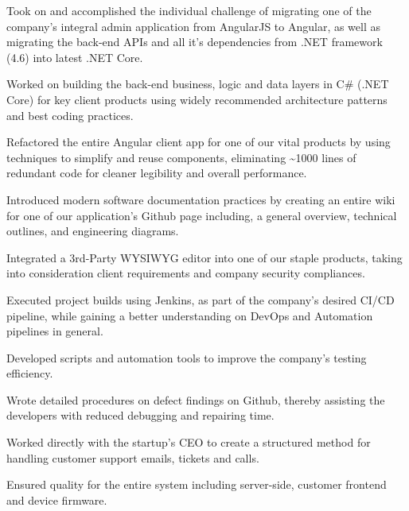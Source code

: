 \documentclass[]{deedy-resume}
\begin{document}
\begin{tightemize}
\item Took on and accomplished the individual challenge of migrating one of the company's integral admin application from AngularJS to Angular, as well as migrating the back-end APIs and all it's dependencies from .NET framework (4.6) into latest .NET Core.
\item Worked on building the back-end business, logic and data layers in C\# (.NET Core) for key client products using widely recommended architecture patterns and best coding practices. 
\item Refactored the entire Angular client app for one of our vital products by using techniques to simplify and reuse components, eliminating \textasciitilde1000 lines of redundant code for cleaner legibility and overall performance.
\item Introduced modern software documentation practices by creating an entire wiki for one of our application's Github page including, a general overview, technical outlines, and engineering diagrams.
\item Integrated a 3rd-Party WYSIWYG editor into one of our staple products, taking into consideration client requirements and company security compliances.
\item Executed project builds using Jenkins, as part of the company's desired CI/CD pipeline, while gaining a better understanding on DevOps and Automation pipelines in general. 
\end{tightemize}
\sectionsep

\begin{tightemize}
\item Developed scripts and automation tools to improve the company's testing efficiency.
\item Wrote detailed procedures on defect findings on Github, thereby assisting the developers with reduced debugging and repairing time.
\item Worked directly with the startup's CEO to create a structured method for handling customer support emails, tickets and calls.
\item Ensured quality for the entire system including server-side, customer frontend and device firmware.
\end{tightemize}
\sectionsep
\end{document}
